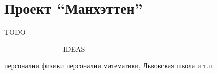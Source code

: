 \chapter{Проект ``Манхэттен''}

TODO

------------------------ IDEAS ------------------------ 

персоналии физики
персоналии математики, Львовская школа и т.п.

